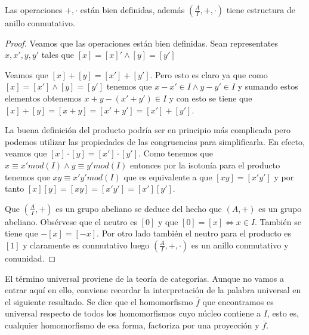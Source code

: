 \begin{proposition}
	Las operaciones $+,\cdot$ están bien definidas, además $(\frac{A}{I},+,\cdot)$ tiene estructura de anillo conmutativo.
\end{proposition}
\begin{proof}
	Veamos que las operaciones están bien definidas. Sean representates $x,x',y,y'$ tales que $[x] = [x]' \land [y] = [y']$ 
	
	Veamos que $[x] + [y] = [x'] + [y']$. Pero esto es claro ya que como $[x] = [x'] \land [y] = [y']$ tenemos que $x-x' \in I \land y-y' \in I$ y sumando estos elementos obtenemos $x+y - (x'+y') \in I$ y con esto se tiene que $[x] + [y] = [x+y] = [x'+y'] = [x']+[y']$. 
	
	La buena definición del producto podría ser en principio más complicada pero podemos utilizar las propiedades de las congruencias para simplificarla. En efecto, veamos que $[x] \cdot [y] = [x'] \cdot [y']$. Como tenemos que $x \equiv x' mod(I) \land y \equiv y' mod(I)$ entonces por la isotonía para el producto tenemos que $xy \equiv x'y' mod(I)$ que es equivalente a que $[xy] = [x'y']$ y por tanto $[x][y] = [xy] = [x'y'] = [x'][y']$. 
	
	Que $(\frac{A}{I},+)$ es un grupo abeliano se deduce del hecho que $(A,+)$ es un grupo abeliano. Obsérvese que el neutro es $[0]$ y que $[0] = [x] \iff x \in I$. También se tiene que $-[x] = [-x]$.  Por otro lado también el neutro para el producto es $[1]$ y claramente es conmutativo luego $(\frac{A}{I},+,\cdot)$ es un anillo conmutativo y conunidad. 
\end{proof}

El término universal proviene de la teoría de categorías. Aunque no vamos a entrar aquí en ello, conviene recordar la interpretación de la palabra universal en el siguiente resultado. Se dice que el homomorfismo $\overline{f}$ que encontramos es universal respecto de todos los homomorfismos cuyo núcleo contiene a $I$, esto es, cualquier homomorfismo de esa forma, factoriza por una proyección y $\overline{f}$.

